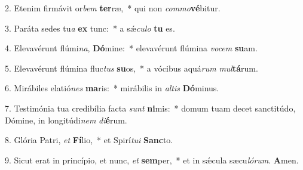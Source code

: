 
2. Etenim firmávit or\textit{bem} \textbf{ter}ræ,~* qui non \textit{com}\textit{mo}\textbf{vé}bitur.

3. Paráta sedes tu\textit{a} \textbf{ex} tunc:~* a s\'{\ae}\textit{cu}\textit{lo} \textbf{tu} es.

4. Elevavérunt flúmi\textit{na}, \textbf{Dó}mine:~* elevavérunt flúmina \textit{vo}\textit{cem} \textbf{su}am.

5. Elevavérunt flúmina fluc\textit{tus} \textbf{su}os,~* a vócibus aquá\textit{rum} \textit{mul}\textbf{tá}rum.

6. Mirábiles elatió\textit{nes} \textbf{ma}ris:~* mirábilis in \textit{al}\textit{tis} \textbf{Dó}minus.

7. Testimónia tua credibília facta \textit{sunt} \textbf{ni}mis:~* domum tuam decet sanctitúdo, Dómine, in longitúdi\textit{nem} \textit{di}\textbf{é}rum.

8. Glória Patri, \textit{et} \textbf{Fí}lio,~* et Spirí\textit{tu}\textit{i} \textbf{Sanc}to.

9. Sicut erat in princípio, et nunc, \textit{et} \textbf{sem}per,~* et in s\'{\ae}cula sæcu\textit{ló}\textit{rum}. \textbf{A}men.
